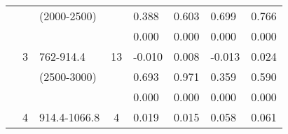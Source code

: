 \begin{table}[p]
\begin{tabular}{cclcllll}
                                                               &                                                                 & (2000-2500)                                                           &                                                                        &  0.388                                      & 0.603                                           & 0.699                                              & 0.766  \\ 
                                                               &                                                                 &                                                                                &                                                                        &  0.000                                      & 0.000                                           & 0.000                                              & 0.000  \\ \cline{5-8}\noalign{\smallskip}
                                                               & 3                                                              & 762-914.4                                                              & 13                                                                   & -0.010                                      & 0.008                                           & -0.013                                             & 0.024  \\ 
                                                               &                                                                 & (2500-3000)                                                           &                                                                        & 0.693                                       & 0.971                                           & 0.359                                              & 0.590 \\
                                                               &                                                                 &                                                                                &                                                                        &  0.000                                      & 0.000                                           & 0.000                                              & 0.000  \\ \cline{5-8}\noalign{\smallskip}
                                                               & 4                                                              & 914.4-1066.8                                                         & 4                                                                     & 0.019                                       & 0.015                                           & 0.058                                              & 0.061  \\ 

\end{tabular}
\end{table}

